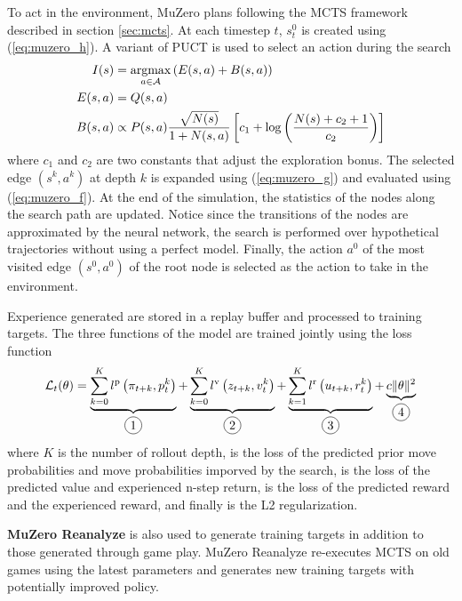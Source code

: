 To act in the environment, MuZero plans following the MCTS framework described in section \ref{sec:mcts}.
At each timestep $t$, $s^0_t$ is created using (\ref{eq:muzero_h}).
A variant of PUCT is used to select an action during the search
\begin{align*}
    I(s)     & = \operatorname*{argmax}_{a \in \mathcal{A}} \left( E(s, a) + B(s, a) \right)  \\
    E(s, a)  & = Q(s, a)  \\
    B(s, a)  & \propto P(s, a) \frac{\sqrt{N(s)}}{1+N(s, a)}\left[c_{1}+\log \left(\frac{N(s)+c_{2}+1}{c_{2}}\right)\right]
\end{align*}
where $c_1$ and $c_2$ are two constants that adjust the exploration bonus.
The selected edge $(s^k, a^k)$ at depth $k$ is expanded using (\ref{eq:muzero_g}) and evaluated using (\ref{eq:muzero_f}).
At the end of the simulation, the statistics of the nodes along the search path are updated.
Notice since the transitions of the nodes are approximated by the neural network, the search is performed over hypothetical trajectories without using a perfect model.
Finally, the action $a^0$ of the most visited edge $(s^0, a^0)$ of the root node is selected as the action to take in the environment.

Experience generated are stored in a replay buffer and processed to training targets.
The three functions of the model are trained jointly using the loss function
\begin{equation}
    \mathcal{L}_{t}(\theta)=
    \underbrace{\sum_{k=0}^{K} l^{\mathrm{p}}\left(\pi_{t+k}, p_{t}^{k}\right)}_{\circled{1}}
    +
    \underbrace{\sum_{k=0}^{K} l^{\mathrm{v}}\left(z_{t+k}, v_{t}^{k}\right)}_{\circled{2}}
    +
    \underbrace{\sum_{k=1}^{K} l^{\mathrm{r}}\left(u_{t+k}, r_{t}^{k}\right)}_{\circled{3}}
    +
    \underbrace{c\|\theta\|^{2}}_{\circled{4}}
\end{equation}
where $K$ is the number of rollout depth,  is the loss of the predicted prior move probabilities and move probabilities imporved by the search,  is the loss of the predicted value and experienced n-step return,
 is the loss of the predicted reward and the experienced reward, and finally  is the L2 regularization.

\textbf{MuZero Reanalyze} is also used to generate training targets in addition to those generated through game play.
MuZero Reanalyze re-executes MCTS on old games using the latest parameters and generates new training targets with potentially improved policy.